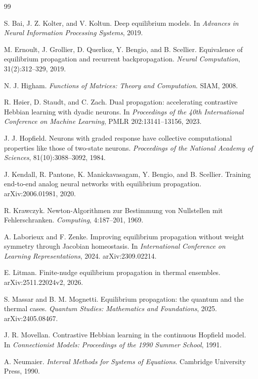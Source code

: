 \documentclass[11pt]{article}
\theoremstyle{definition}
\theoremstyle{remark}
\begin{document}
\begin{thebibliography}{99}
\small

 S. Bai, J. Z. Kolter, and V. Koltun. Deep equilibrium models. In
\emph{Advances in Neural Information Processing Systems}, 2019.

 M. Ernoult, J. Grollier, D. Querlioz, Y. Bengio, and B. Scellier.
Equivalence of equilibrium propagation and recurrent backpropagation.
\emph{Neural Computation}, 31(2):312--329, 2019.

 N. J. Higham. \emph{Functions of Matrices: Theory and Computation}.
SIAM, 2008.

 R. H{\o}ier, D. Staudt, and C. Zach. Dual propagation: accelerating
contrastive Hebbian learning with dyadic neurons. In \emph{Proceedings of the 40th International
Conference on Machine Learning}, PMLR 202:13141--13156, 2023.

 J. J. Hopfield. Neurons with graded response have collective computational
properties like those of two-state neurons. \emph{Proceedings of the National Academy of
Sciences}, 81(10):3088--3092, 1984.

 J. Kendall, R. Pantone, K. Manickavasagam, Y. Bengio, and B. Scellier.
Training end-to-end analog neural networks with equilibrium propagation. arXiv:2006.01981, 2020.

 R. Krawczyk. Newton-Algorithmen zur Bestimmung von Nullstellen mit
Fehlerschranken. \emph{Computing}, 4:187--201, 1969.

 A. Laborieux and F. Zenke. Improving equilibrium propagation without
weight symmetry through Jacobian homeostasis. In \emph{International Conference on Learning
Representations}, 2024. arXiv:2309.02214.

 E. Litman. Finite-nudge equilibrium propagation in thermal ensembles.
arXiv:2511.22024v2, 2026.

 S. Massar and B. M. Mognetti. Equilibrium propagation: the quantum and the
thermal cases. \emph{Quantum Studies: Mathematics and Foundations}, 2025. arXiv:2405.08467.

 J. R. Movellan. Contrastive Hebbian learning in the continuous Hopfield
model. In \emph{Connectionist Models: Proceedings of the 1990 Summer School}, 1991.

 A. Neumaier. \emph{Interval Methods for Systems of Equations}. Cambridge
University Press, 1990.


\end{thebibliography}
\end{document}

